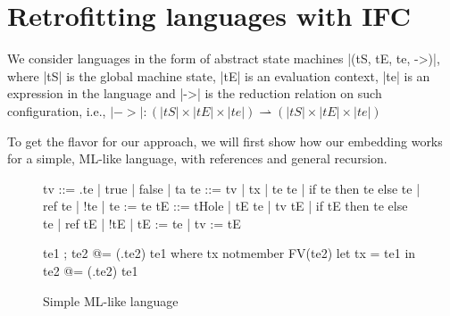\section{Retrofitting languages with IFC}
\label{sec:retrofit}


We consider languages in the form of abstract state machines |(tS, tE,
te, ->)|, where |tS| is the global machine state, |tE| is an evaluation
context, |te| is an expression in the language and |->| is the
reduction relation on such configuration, i.e., $|->| : (|tS| \times
|tE| \times |te|) \rightharpoonup (|tS| \times |tE| \times |te|)$


To get the flavor for our approach, we will first show how our embedding
works for a simple, ML-like language, with references and general recursion.

\begin{figure}
\begin{code}
tv   ::= \tx.te | true | false | ta
te   ::= tv | tx | te te | if te then te else te | ref te | !te | te := te
tE   ::= tHole | tE te | tv tE | if tE then te else te
       | ref tE | !tE | tE := te | tv := tE 

te1 ; te2            @= (\tx.te2) te1  where  tx notmember FV(te2)
let tx = te1 in te2  @= (\tx.te2) te1
\end{code}


\caption{Simple ML-like language}
\label{fig:ml}
\end{figure}

